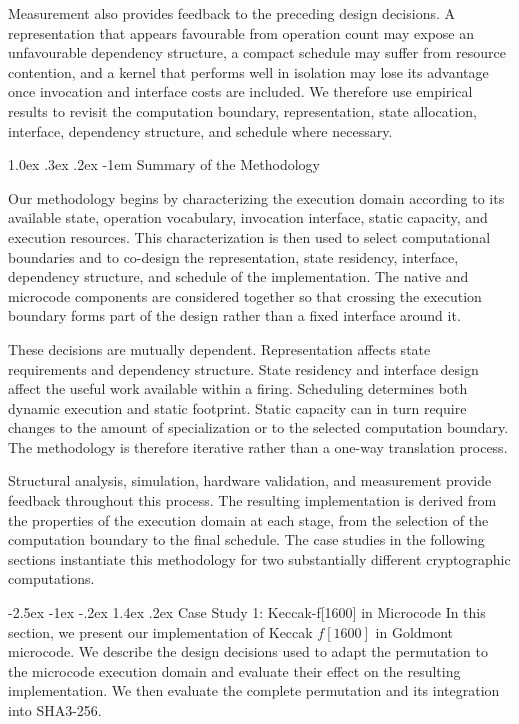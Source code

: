 \documentclass[journal=tches,submission]{iacrtrans}
\makeatletter
\renewcommand\section{\@startsection{section}{1}{\z@}%
      {-2.5ex \@plus -1ex \@minus -.2ex}%
      {1.4ex \@plus .2ex}%
      {\normalfont\Large\bfseries\SS@sectfont}}
\renewcommand\paragraph{\@startsection{paragraph}{4}{\z@}%
      {1.0ex \@plus .3ex \@minus .2ex}%
      {-1em}%
      {\normalfont\normalsize\bfseries\SS@parafont}}
\makeatother
\begin{document}
Measurement also provides feedback to the preceding design decisions.
A representation that appears favourable from operation count may expose an unfavourable dependency structure, a compact schedule may suffer from resource contention, and a kernel that performs well in isolation may lose its advantage once invocation and interface costs are included.
We therefore use empirical results to revisit the computation boundary, representation, state allocation, interface, dependency structure, and schedule where necessary.

\paragraph{Summary of the Methodology}
\label{sec:method-summary}

Our methodology begins by characterizing the execution domain according to its available state, operation vocabulary, invocation interface, static capacity, and execution resources. 
This characterization is then used to select computational boundaries and to co-design the representation, state residency, interface, dependency structure, and schedule of the implementation. 
The native and microcode components are considered together so that crossing the execution boundary forms part of the design rather than a fixed interface around it. 

These decisions are mutually dependent. 
Representation affects state requirements and dependency structure. 
State residency and interface design affect the useful work available within a firing. 
Scheduling determines both dynamic execution and static footprint. 
Static capacity can in turn require changes to the amount of specialization or to the selected computation boundary. 
The methodology is therefore iterative rather than a one-way translation process.

Structural analysis, simulation, hardware validation, and measurement provide feedback throughout this process. 
The resulting implementation is derived from the properties of the execution domain at each stage, from the selection of the computation boundary to the final schedule. 
The case studies in the following sections instantiate this methodology for two substantially different cryptographic computations.


\section{Case Study 1: Keccak-f[1600] in Microcode}
\label{sec:keccak}
In this section, we present our implementation of Keccak $f[1600]$ in Goldmont microcode.
We describe the design decisions used to adapt the permutation to the microcode execution domain and evaluate their effect on the resulting implementation.
We then evaluate the complete permutation and its integration into SHA3-256.
\end{document}
